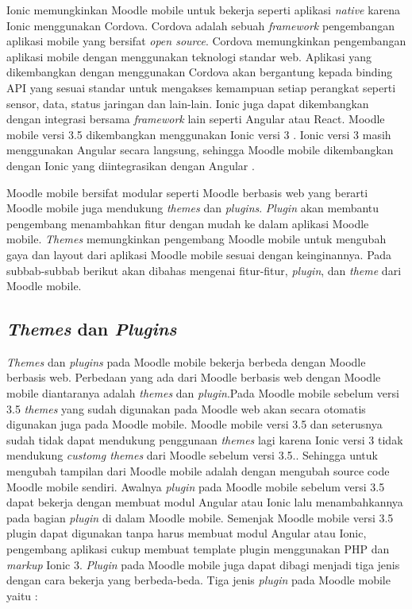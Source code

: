 Ionic memungkinkan Moodle mobile untuk bekerja seperti aplikasi \textit{native} karena Ionic menggunakan Cordova. Cordova adalah sebuah \textit{framework} pengembangan aplikasi mobile yang bersifat \textit{open source}. Cordova memungkinkan pengembangan aplikasi mobile dengan menggunakan teknologi standar web. Aplikasi yang dikembangkan dengan menggunakan Cordova akan bergantung kepada binding API yang sesuai standar untuk mengakses kemampuan setiap perangkat seperti sensor, data, status jaringan dan lain-lain\cite{cordova:overview}. Ionic juga dapat dikembangkan dengan integrasi bersama \textit{framework} lain seperti Angular atau React. Moodle mobile versi 3.5 dikembangkan menggunakan Ionic versi 3 \cite{Moodlemobile:mm}. Ionic versi 3 masih menggunakan Angular secara langsung, sehingga Moodle mobile dikembangkan dengan Ionic yang diintegrasikan dengan Angular \cite{Moodlemobile:ionicangular}.

Moodle mobile bersifat modular seperti Moodle berbasis web yang berarti Moodle mobile juga mendukung \textit{themes} dan \textit{plugins}. \textit{Plugin} akan membantu pengembang menambahkan fitur dengan mudah ke dalam aplikasi Moodle mobile. \textit{Themes} memungkinkan pengembang Moodle mobile untuk mengubah gaya dan layout dari aplikasi Moodle mobile sesuai dengan keinginannya. Pada subbab-subbab berikut akan dibahas mengenai fitur-fitur, \textit{plugin}, dan \textit{theme} dari Moodle mobile.
\subsection{\textit{Themes} dan \textit{Plugins}}
\textit{Themes} dan \textit{plugins} pada Moodle mobile bekerja berbeda dengan Moodle berbasis web. Perbedaan yang ada dari Moodle berbasis web dengan Moodle mobile diantaranya adalah \textit{themes} dan \textit{plugin}.Pada Moodle mobile sebelum versi 3.5 \textit{themes} yang sudah digunakan pada Moodle web akan secara otomatis digunakan juga pada Moodle mobile. Moodle mobile versi 3.5 dan seterusnya sudah tidak dapat mendukung penggunaan \textit{themes} lagi karena Ionic versi 3 tidak mendukung \textit{customg themes} dari Moodle sebelum versi 3.5.\cite{Moodlemobile:themes}. Sehingga untuk mengubah tampilan dari Moodle mobile adalah dengan mengubah source code Moodle mobile sendiri. Awalnya \textit{plugin} pada Moodle mobile sebelum versi 3.5 dapat bekerja dengan membuat modul Angular atau Ionic lalu menambahkannya pada bagian \textit{plugin} di dalam Moodle mobile. Semenjak Moodle mobile versi 3.5 plugin dapat digunakan tanpa harus membuat modul Angular atau Ionic, pengembang aplikasi cukup membuat template plugin menggunakan PHP dan \textit{markup} Ionic 3\cite{Moodlemobile:plugin}. \textit{Plugin} pada Moodle mobile juga dapat dibagi menjadi tiga jenis dengan cara bekerja yang berbeda-beda. Tiga jenis \textit{plugin} pada Moodle mobile yaitu :

